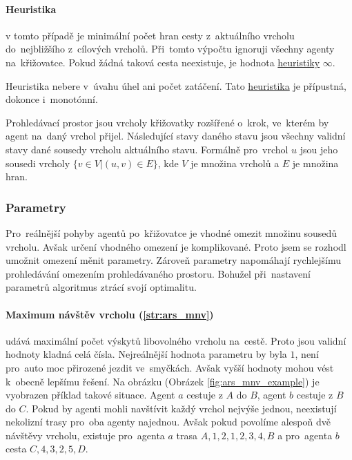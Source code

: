 \paragraph{Heuristika}\label{par:ars_heuristika} v tomto případě je minimální počet hran cesty
z~aktuálního vrcholu do~nejbližšího z~cílových vrcholů.
Při~tomto výpočtu ignoruji všechny agenty na~křižovatce.
Pokud žádná taková cesta neexistuje, je hodnota \hyperref[par:ars_heuristika]{heuristiky} $\infty$.

Heuristika nebere v~úvahu úhel ani počet zatáčení.
Tato \hyperref[par:ars_heuristika]{heuristika} je přípustná, dokonce i~monotónní.

Prohledávací prostor jsou vrcholy křižovatky rozšířené o~krok, ve~kterém by agent na~daný vrchol přijel.
Následující stavy daného stavu jsou všechny validní stavy dané sousedy vrcholu aktuálního stavu.
Formálně pro~vrchol $u$ jsou jeho sousedi vrcholy $\{v \in V | (u,v)\in E\}$,
kde $V$ je množina vrcholů a $E$ je množina hran.

\subsubsection{Parametry}\label{subsubsec:ars_parametry}
Pro~reálnější pohyby agentů po~křižovatce je vhodné omezit množinu sousedů vrcholu.
Avšak určení vhodného omezení je komplikované.
Proto jsem se rozhodl umožnit omezení měnit parametry.
Zároveň parametry napomáhají rychlejšímu prohledávání omezením prohledávaného prostoru.
Bohužel při~nastavení parametrů algoritmus ztrácí svojí optimalitu.

\paragraph{Maximum návštěv vrcholu (\ref{str:ars_mnv})}
udává maximální počet výskytů libovolného vrcholu na~cestě.
Proto jsou validní hodnoty kladná celá čísla.
Nejreálnější hodnota parametru by byla $1$, není pro~auto moc přirozené jezdit ve~smyčkách.
Avšak vyšší hodnoty mohou vést k~obecně lepšímu řešení.
Na obrázku (Obrázek \ref{fig:ars_mnv_example}) je vyobrazen příklad takové situace.
Agent $a$ cestuje z $A$ do $B$, agent $b$ cestuje z $B$ do $C$.
Pokud by agenti mohli navštívit každý vrchol nejvýše jednou, neexistují nekolizní trasy pro~oba agenty najednou.
Avšak pokud povolíme alespoň dvě návštěvy vrcholu, existuje pro~agenta $a$ trasa $A, 1, 2, 1, 2, 3, 4, B$
a pro~agenta $b$ cesta $C, 4, 3, 2, 5, D$.

